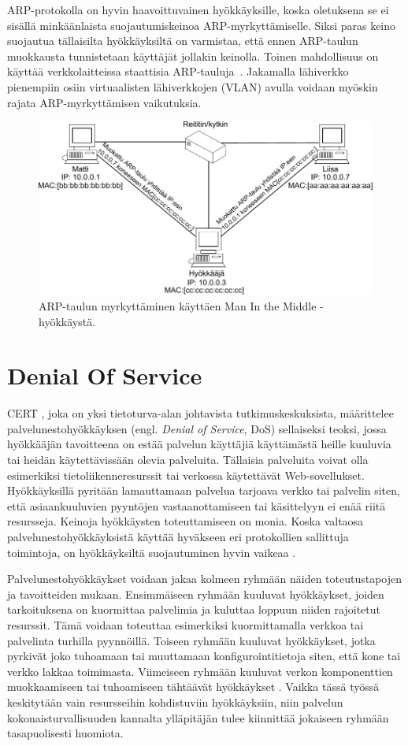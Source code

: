 ARP-protokolla on hyvin haavoittuvainen hyökkäyksille, koska
oletuksena se ei sisällä minkäänlaista suojautumiskeinoa
ARP-myrkyttämiselle. Siksi paras keino suojautua tällaisilta
hyökkäyksiltä on varmistaa, että ennen ARP-taulun muokkausta
tunnistetaan käyttäjät jollakin keinolla. Toinen mahdollisuus on
käyttää verkkolaitteissa staattisia ARP-tauluja~\cite{WEBS}. Jakamalla
lähiverkko pienempiin osiin virtuaalisten lähiverkkojen (VLAN) avulla
voidaan myöskin rajata ARP-myrkyttämisen vaikutuksia.

\begin{figure}[ht]
\centering
\includegraphics[width=12cm]{pics/arp.pdf}
\caption{ARP-taulun myrkyttäminen käyttäen Man In the Middle -hyökkäystä.}
\label{ARP-spoofing}
\end{figure}

\section{Denial Of Service}

CERT \cite{CERT}, joka on yksi tietoturva-alan johtavista
tutkimuskeskuksista, määrittelee palvelunestohyökkäyksen
(engl. \textit{Denial of Service}, DoS) sellaiseksi teoksi, jossa
hyökkääjän tavoitteena on estää palvelun käyttäjiä käyttämästä heille
kuuluvia tai heidän käytettävissään olevia palveluita. Tällaisia
palveluita voivat olla esimerkiksi tietoliikenneresurssit tai verkossa
käytettävät Web-sovellukset. Hyökkäyksillä pyritään lamauttamaan
palvelua tarjoava verkko tai palvelin siten, että asiaankuuluvien
pyyntöjen vastaanottamiseen tai käsittelyyn ei enää riitä
resursseja. Keinoja hyökkäysten toteuttamiseen on monia. Koska
valtaosa palvelunestohyökkäyksistä käyttää hyväkseen eri protokollien
sallittuja toimintoja, on hyökkäyksiltä suojautuminen hyvin vaikeaa
\cite{Hacking}.

Palvelunestohyökkäykset voidaan jakaa kolmeen ryhmään näiden
toteutustapojen ja tavoitteiden mukaan. Ensimmäiseen ryhmään kuuluvat
hyökkäykset, joiden tarkoituksena on kuormittaa palvelimia ja kuluttaa
loppuun niiden rajoitetut resurssit. Tämä voidaan toteuttaa esimerkiksi
kuormittamalla verkkoa tai palvelinta turhilla pyynnöillä. Toiseen
ryhmään kuuluvat hyökkäykset, jotka pyrkivät joko tuhoamaan tai
muuttamaan konfigurointitietoja siten, että kone tai verkko lakkaa
toimimasta. Viimeiseen ryhmään kuuluvat verkon komponenttien
muokkaamiseen tai tuhoamiseen tähtäävät hyökkäykset
\cite{CERT}. Vaikka tässä työssä keskitytään vain resursseihin
kohdistuviin hyökkäyksiin, niin palvelun kokonaisturvallisuuden
kannalta ylläpitäjän tulee kiinnittää jokaiseen ryhmään tasapuolisesti
huomiota.

